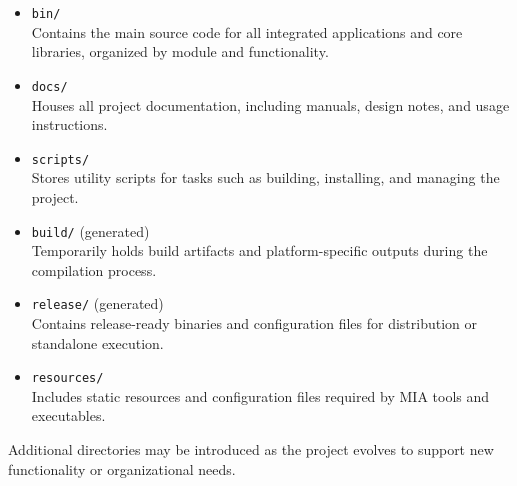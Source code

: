 \begin{itemize}
	\item \texttt{bin/} \hfill \\ 
	Contains the main source code for all integrated applications and core libraries, organized by module and functionality.
	
	\item \texttt{docs/} \hfill \\ 
	Houses all project documentation, including manuals, design notes, and usage instructions.
	
	\item \texttt{scripts/} \hfill \\ 
	Stores utility scripts for tasks such as building, installing, and managing the project.
	
	\item \texttt{build/} (generated) \hfill \\ 
	Temporarily holds build artifacts and platform-specific outputs during the compilation process.
	
	\item \texttt{release/} (generated) \hfill \\ 
	Contains release-ready binaries and configuration files for distribution or standalone execution.
	
	\item \texttt{resources/} \hfill \\ 
	Includes static resources and configuration files required by MIA tools and executables.
\end{itemize}

Additional directories may be introduced as the project evolves to support new functionality or organizational needs.
